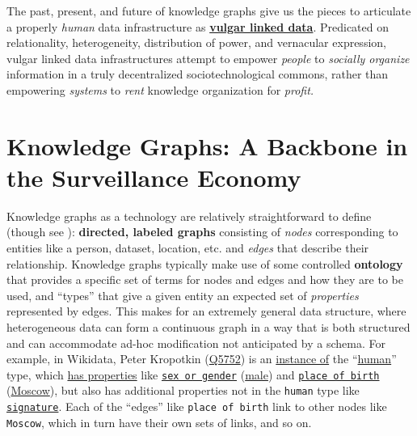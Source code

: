 \documentclass{article}
\begin{document}
The past, present, and future of knowledge graphs give us the pieces to
articulate a properly \emph{human} data infrastructure as
\protect\hyperlink{vulgar-linked-data}{\textbf{vulgar linked data}}.
Predicated on relationality, heterogeneity, distribution of power, and
vernacular expression, vulgar linked data infrastructures attempt to
empower \emph{people} to \emph{socially organize} information in a truly
decentralized sociotechnological commons, rather than empowering
\emph{systems} to \emph{rent} knowledge organization for \emph{profit.}

\hypertarget{knowledge-graphs-a-backbone-in-the-surveillance-economy}{%
\section{Knowledge Graphs: A Backbone in the Surveillance
Economy}\label{knowledge-graphs-a-backbone-in-the-surveillance-economy}}

Knowledge graphs as a technology are relatively straightforward to
define \cite{chaudhriKnowledgeGraphsIntroduction2022, hitzlerReviewSemanticWeb2021, yanRetrospectiveKnowledgeGraphs2018, bergmanCommonSenseView2019}  (though see \cite{ehrlingerDefinitionKnowledgeGraphs2016} ): \textbf{directed, labeled
graphs} consisting of \emph{nodes} corresponding to entities like a
person, dataset, location, etc. and \emph{edges} that describe their
relationship. Knowledge graphs
typically make use of some controlled \textbf{ontology} that provides a
specific set of terms for nodes and edges and how they are to be used,
and ``types'' that give a given entity an expected set of
\emph{properties} represented by edges. This makes for an extremely
general data structure, where heterogeneous data can form a continuous
graph in a way that is both structured and can accommodate ad-hoc
modification not anticipated by a schema. For example, in Wikidata,
Peter Kropotkin (\href{https://www.wikidata.org/wiki/Q5752}{Q5752}) is
an \href{https://www.wikidata.org/wiki/Property:P31}{instance of} the
``\href{https://www.wikidata.org/wiki/Q5}{human}'' type, which
\href{https://www.wikidata.org/wiki/Property:P1963}{has properties} like
\href{https://www.wikidata.org/wiki/Property:P21}{\texttt{sex\ or\ gender}}
(\href{https://www.wikidata.org/wiki/Q6581097}{male}) and
\href{https://www.wikidata.org/wiki/Property:P19}{\texttt{place\ of\ birth}}
(\href{https://www.wikidata.org/wiki/Q649}{Moscow}), but also has
additional properties not in the \texttt{human} type like
\href{https://www.wikidata.org/wiki/Property:P109}{\texttt{signature}}.
Each of the ``edges'' like \texttt{place\ of\ birth} link to other nodes
like \texttt{Moscow}, which in turn have their own sets of links, and so
on.
\end{document}

